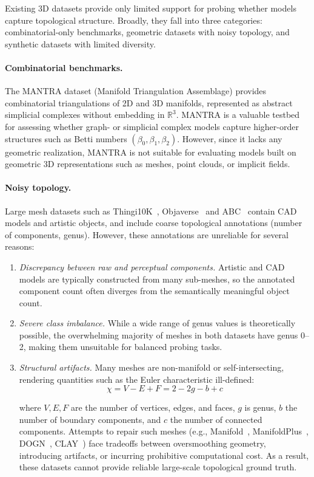Existing 3D datasets provide only limited support for probing whether models capture topological structure. Broadly, they fall into three categories: combinatorial-only benchmarks, geometric datasets with noisy topology, and synthetic datasets with limited diversity.

\paragraph{Combinatorial benchmarks.}
The MANTRA dataset (Manifold Triangulation Assemblage) \cite{mantra} provides combinatorial triangulations of 2D and 3D manifolds, represented as abstract simplicial complexes without embedding in $\mathbb{R}^3$. MANTRA is a valuable testbed for assessing whether graph- or simplicial complex models capture higher-order structures such as Betti numbers $(\beta_0, \beta_1, \beta_2)$. However, since it lacks any geometric realization, MANTRA is not suitable for evaluating models built on geometric 3D representations such as meshes, point clouds, or implicit fields.



\paragraph{Noisy topology.}
Large mesh datasets such as Thingi10K~\cite{thingi}, Objaverse~\cite{objaverse} and ABC~\cite{abc} contain CAD models and artistic objects, and include coarse topological annotations (number of components, genus). However, these annotations are unreliable for several reasons:

\begin{enumerate}
  \item \textit{Discrepancy between raw and perceptual components.} Artistic and CAD models are typically constructed from many sub-meshes, so the annotated component count often diverges from the semantically meaningful object count.
  \item \textit{Severe class imbalance.} While a wide range of genus values is theoretically possible, the overwhelming majority of meshes in both datasets have genus 0–2, making them unsuitable for balanced probing tasks.
  \item \textit{Structural artifacts.} Many meshes are non-manifold or self-intersecting, rendering quantities such as the Euler characteristic ill-defined:
\begin{equation}
  \chi = V - E + F = 2 - 2g - b + c
  \label{eq:euler}
\end{equation}

where $V,E,F$ are the number of vertices, edges, and faces, $g$ is genus, $b$ the number of boundary components, and $c$ the number of connected components.
Attempts to repair such meshes (e.g., Manifold~\cite{manifold}, ManifoldPlus~\cite{manifoldplus}, DOGN~\cite{dogn}, CLAY~\cite{clay}) face tradeoffs between oversmoothing geometry, introducing artifacts, or incurring prohibitive computational cost. As a result, these datasets cannot provide reliable large-scale topological ground truth.
\end{enumerate}

